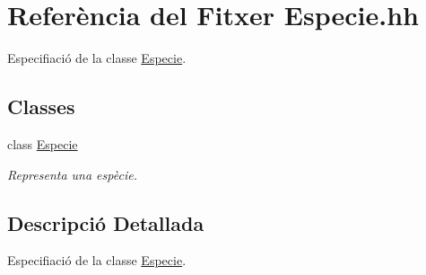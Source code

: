 \hypertarget{_especie_8hh}{}\section{Referència del Fitxer Especie.\+hh}
\label{_especie_8hh}


Especifiació de la classe \hyperlink{class_especie}{Especie}.  


\subsection*{Classes}
\begin{DoxyCompactItemize}
\item 
class \hyperlink{class_especie}{Especie}
\begin{DoxyCompactList}\small\item\em Representa una espècie. \end{DoxyCompactList}\end{DoxyCompactItemize}


\subsection{Descripció Detallada}
Especifiació de la classe \hyperlink{class_especie}{Especie}. 

